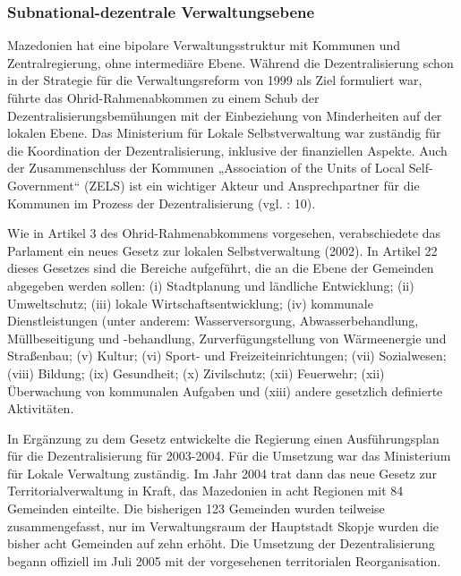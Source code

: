 \subsubsection{Subnational-dezentrale Verwaltungsebene}
Mazedonien hat eine bipolare Verwaltungsstruktur mit Kommunen und Zentralregierung, ohne intermediäre Ebene. Während die Dezentralisierung schon in der Strategie für die Verwaltungsreform von 1999 als Ziel formuliert war, führte das Ohrid-Rahmenabkommen zu einem Schub der Dezentralisierungsbemühungen mit der Einbeziehung von Minderheiten auf der lokalen Ebene. Das Ministerium für Lokale Selbstverwaltung war zuständig für die Koordination der Dezentralisierung, inklusive der finanziellen Aspekte. Auch der Zusammenschluss der Kommunen „Association of the Units of Local Self-Government“ (ZELS) ist ein wichtiger Akteur und Ansprechpartner für die Kommunen im Prozess der Dezentralisierung (vgl. \cite{analyt07} : 10).\par
Wie in Artikel 3 des Ohrid-Rahmenabkommens vorgesehen, verabschiedete das Parlament ein neues Gesetz zur lokalen Selbstverwaltung (2002). In Artikel 22 dieses Gesetzes sind die Bereiche aufgeführt, die an die Ebene der Gemeinden abgegeben werden sollen: (i) Stadtplanung und ländliche Entwicklung; (ii) Umweltschutz; (iii) lokale Wirtschaftsentwicklung; (iv) kommunale Dienstleistungen (unter anderem: Wasserversorgung, Abwasserbehandlung, Müllbeseitigung und -behandlung, Zurverfügungstellung von Wärmeenergie und Straßenbau; (v) Kultur; (vi) Sport- und Freizeiteinrichtungen; (vii) Sozialwesen; (viii) Bildung; (ix) Gesundheit; (x) Zivilschutz; (xii) Feuerwehr; (xii) Überwachung von kommunalen Aufgaben und (xiii) andere gesetzlich definierte Aktivitäten.\par
In Ergänzung zu dem Gesetz entwickelte die Regierung einen Ausführungsplan für die Dezentralisierung für 2003-2004. Für die Umsetzung war das Ministerium für Lokale Verwaltung zuständig. Im Jahr 2004 trat dann das neue Gesetz zur Territorialverwaltung in Kraft, das Mazedonien in acht Regionen mit 84 Gemeinden einteilte. Die bisherigen 123 Gemeinden wurden teilweise zusammengefasst, nur im Verwaltungsraum der Hauptstadt Skopje wurden die bisher acht Gemeinden auf zehn erhöht. Die Umsetzung der Dezentralisierung begann offiziell im Juli 2005 mit der vorgesehenen territorialen Reorganisation. \par
